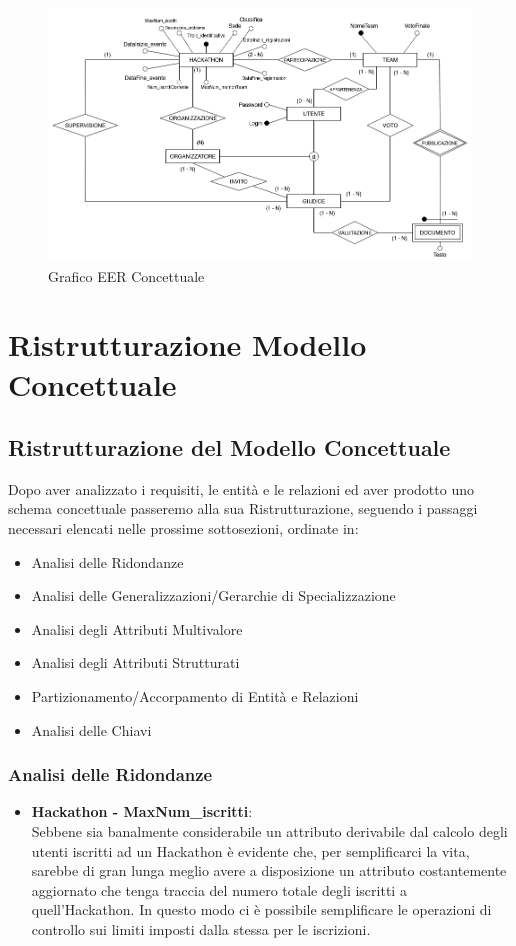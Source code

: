 \documentclass[a4paper, 10pt]{article}
\begin{document}
	\begin{figure}[H]
		\centering
		\includegraphics[width=1\textwidth]{../Immagini/EERDiagram_Hackathon}
		\caption[Grafico UML]{Grafico EER Concettuale}
	\end{figure}
	\newpage
	\section{Ristrutturazione Modello Concettuale}
	\subsection{Ristrutturazione del Modello Concettuale}
	Dopo aver analizzato i requisiti, le entità e le relazioni ed aver prodotto uno schema concettuale passeremo alla sua Ristrutturazione, seguendo i passaggi necessari elencati nelle prossime sottosezioni, ordinate in:
	\begin{itemize}
		\item Analisi delle Ridondanze
		\item Analisi delle Generalizzazioni/Gerarchie di Specializzazione
		\item Analisi degli Attributi Multivalore
		\item Analisi degli Attributi Strutturati
		\item Partizionamento/Accorpamento di Entità e Relazioni
		\item Analisi delle Chiavi
	\end{itemize}
	\subsubsection{Analisi delle Ridondanze}
	\begin{itemize}
		\item \textbf{Hackathon - MaxNum\_iscritti}:\\Sebbene sia banalmente considerabile un attributo derivabile dal calcolo degli utenti iscritti ad un Hackathon è evidente che, per semplificarci la vita, sarebbe di gran lunga meglio avere a disposizione un attributo costantemente aggiornato che tenga traccia del numero totale degli iscritti a quell'Hackathon. In questo modo ci è possibile semplificare le operazioni di controllo sui limiti imposti dalla stessa per le iscrizioni.
	\end{itemize}
\end{document}
